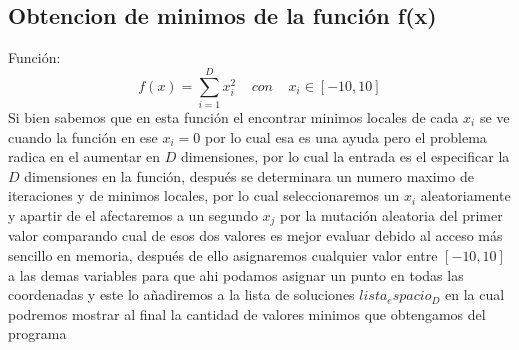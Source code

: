 \documentclass[10pt]{article}
\begin{document}
\subsection{Obtencion de minimos de la función f(x)}
Función:
\[f(x)=\sum_{i=1}^{D}x_{i}^2\;\;\;\;con\;\;\;\;x_{i}\in[-10,10]\]
Si bien sabemos que en esta función el encontrar minimos locales de cada $x_{i}$ se ve cuando la función en ese $x_{i}=0$ por lo cual esa es una ayuda pero el problema radica en el aumentar en $D$ dimensiones, por lo cual la entrada es el especificar la $D$ dimensiones en la función, después se determinara un numero maximo de iteraciones y de minimos locales, por lo cual seleccionaremos un $x_{i}$ aleatoriamente y apartir de el afectaremos a un segundo $x_{j}$ por la mutación aleatoria del primer valor comparando cual de esos dos valores es mejor evaluar debido al acceso más sencillo en memoria, después de ello asignaremos cualquier valor entre $[-10,10]$ a las demas variables para que ahi podamos asignar un punto en todas las coordenadas y este lo añadiremos a la lista de soluciones $lista_espacio_D$ en la cual podremos mostrar al final la cantidad de valores minimos que obtengamos del programa
\end{document}
